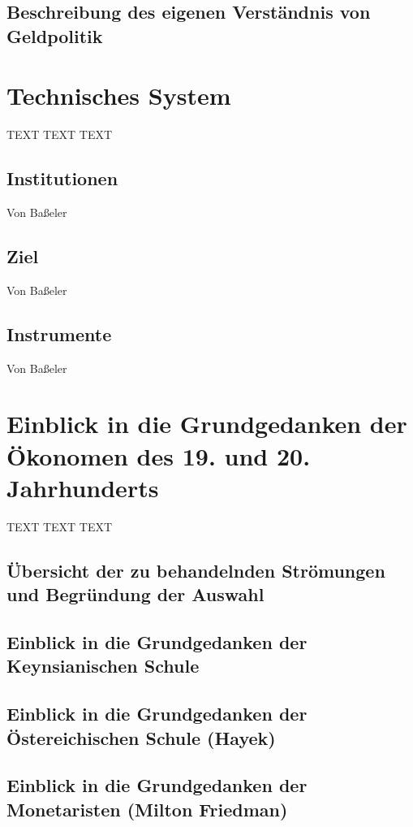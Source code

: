 \documentclass[
onecolumn,
a4paper,
abstracton,
parskip=half
,final
]{scrartcl}
\begin{document}
\subsection{Beschreibung des eigenen Verst{\"a}ndnis von Geldpolitik}

\clearpage

\section{Technisches System}
\label{sec1:technischesSystem}
TEXT TEXT TEXT
\subsection{Institutionen} Von Ba{\ss}eler
\subsection{Ziel}  Von Ba{\ss}eler
\subsection{Instrumente}  Von Ba{\ss}eler

\clearpage






\section{Einblick in die Grundgedanken der {\"O}konomen des 19. und 20. Jahrhunderts}
\label{sec1:stroemungen}
TEXT TEXT TEXT
\subsection{{\"U}bersicht der zu behandelnden Str{\"o}mungen und Begr{\"u}ndung der Auswahl}

\subsection{Einblick in die Grundgedanken der Keynsianischen Schule}

\subsection{Einblick in die Grundgedanken der {\"O}stereichischen Schule (Hayek)}

\subsection{Einblick in die Grundgedanken der Monetaristen (Milton Friedman)}
\end{document}

